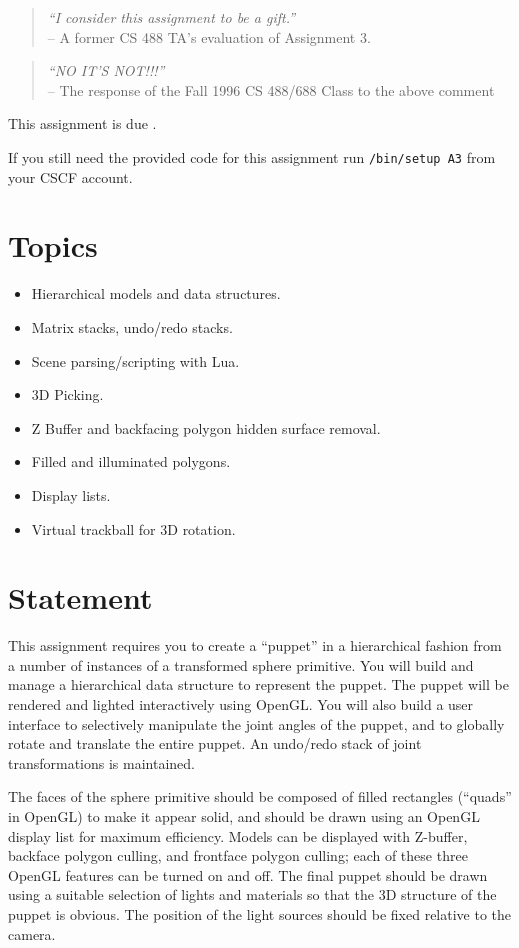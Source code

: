 \begin{quote}
	{\sl ``I consider this assignment to be a gift.''
        } \\
	\mbox{}\hfill -- A former CS 488 TA's evaluation of Assignment 3.
\end{quote}
\begin{quote}
	{\sl ``NO IT'S NOT!!!''
        } \\
	\mbox{}\hfill -- The response of the Fall 1996 CS 488/688 Class to the above comment
\end{quote}
This assignment is due {\bf \AthreeDeadline}.

If you still need the
provided code for this assignment run
 \texttt{\CourseData/bin/setup A3}
from your CSCF account.

\section{Topics}
\begin{itemize}
\item Hierarchical models and data structures.
\item Matrix stacks, undo/redo stacks.
\item Scene parsing/scripting with Lua.
\item 3D Picking.
\item Z Buffer and backfacing polygon hidden surface removal.
\item Filled and illuminated polygons.
\item Display lists.
\item Virtual trackball for 3D rotation.
\end{itemize}

\section{Statement}
This assignment requires you to create a ``puppet'' in a hierarchical
fashion from a number of instances of a transformed sphere primitive.
You will build and manage a hierarchical data 
structure to represent the puppet.
The puppet will be rendered and lighted interactively using OpenGL. 
You will also build a user interface to selectively manipulate 
the joint angles of the puppet, 
and to globally rotate and translate the entire puppet.
An undo/redo stack of joint transformations is maintained.

The faces of the sphere primitive should be composed of filled
rectangles (``quads'' in OpenGL) to make it appear solid, and should
be drawn using an OpenGL display list for maximum efficiency.  Models
can be displayed with Z-buffer, backface polygon culling, and frontface
polygon culling; each of these three OpenGL features can be turned
on and off.  The final puppet should be
drawn using a suitable selection of lights and materials so that the
3D structure of the puppet is obvious.  The position of the light
sources should be fixed relative to the camera.

